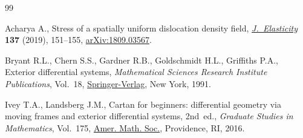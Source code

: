\documentclass[11pt]{article}
\numberwithin{equation}{section}
\begin{document}
\begin{thebibliography}{99}
\footnotesize\itemsep=0pt

Acharya A., Stress of a spatially uniform dislocation density field,
 \href{https://doi.org/10.1007/s10659-018-09717-5}{\textit{J.~Elasticity}} \textbf{137} (2019), 151--155, \href{https://arxiv.org/abs/1809.03567}{arXiv:1809.03567}.

Bryant R.L., Chern S.S., Gardner R.B., Goldschmidt H.L., Griffiths P.A.,
 Exterior differential systems, \textit{Mathematical Sciences Research
 Institute Publications}, Vol.~18, \href{https://doi.org/10.1007/978-1-4613-9714-4}{Springer-Verlag}, New York, 1991.

Ivey T.A., Landsberg J.M., Cartan for beginners: differential geometry via
 moving frames and exterior differential systems, 2nd~ed., \textit{Graduate Studies in
 Mathematics}, Vol.~175, \href{https://doi.org/10.1090/gsm/175}{Amer. Math. Soc.}, Providence, RI, 2016.
\end{thebibliography}
\end{document}
